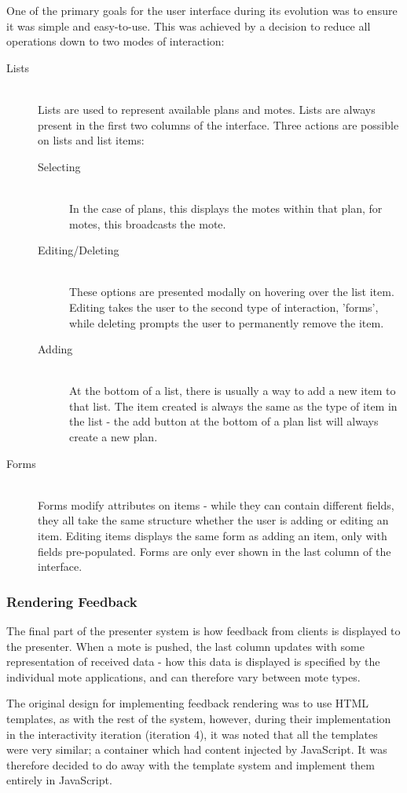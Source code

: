 \documentclass[a4papert,11pt,notitlepage]{ltxdoc}
\begin{document}
One of the primary goals for the user interface during its evolution was to ensure it was simple and easy-to-use. This was achieved by a decision to reduce all operations down to two modes of interaction:
\begin{description}
\item[Lists] \hfill \\
Lists are used to represent available plans and motes. Lists are always present in the first two columns of the interface. Three actions are possible on lists and list items:
\begin{description}
\item[Selecting] \hfill \\
In the case of plans, this displays the motes within that plan, for motes, this broadcasts the mote.
\item[Editing/Deleting] \hfill \\
These options are presented modally on hovering over the list item. Editing takes the user to the second type of interaction, 'forms', while deleting prompts the user to permanently remove the item.
\item[Adding] \hfill \\
At the bottom of a list, there is usually a way to add a new item to that list. The item created is always the same as the type of item in the list - the add button at the bottom of a plan list will always create a new plan.
\end{description}
\item[Forms] \hfill \\
Forms modify attributes on items - while they can contain different fields, they all take the same structure whether the user is adding or editing an item. Editing items displays the same form as adding an item, only with fields pre-populated. Forms are only ever shown in the last column of the interface.
\end{description}

\subsubsection{Rendering Feedback}
The final part of the presenter system is how feedback from clients is displayed to the presenter. When a mote is pushed, the last column updates with some representation of received data - how this data is displayed is specified by the individual mote applications, and can therefore vary between mote types.

The original design for implementing feedback rendering was to use HTML templates, as with the rest of the system, however, during their implementation in the interactivity iteration (iteration 4), it was noted that all the templates were very similar; a container which had content injected by JavaScript. It was therefore decided to do away with the template system and implement them entirely in JavaScript.
\end{document}

